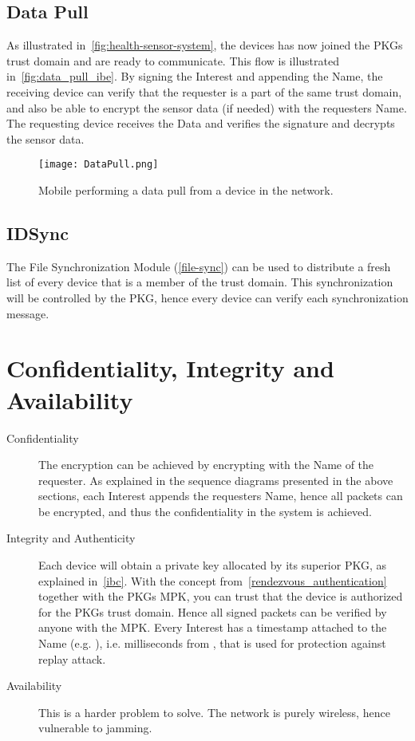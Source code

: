 \subsection{Data Pull}
As illustrated in~\autoref{fig:health-sensor-system}, the devices has now joined the \gls{PKG}s trust domain and are ready to communicate.
This flow is illustrated in~\autoref{fig:data_pull_ibe}.
By signing the Interest and appending the Name, the receiving device can verify that the requester is a part of the same trust domain, and also be able to encrypt the sensor data (if needed) with the requesters Name.
The requesting device receives the Data and verifies the signature and decrypts the sensor data.

\begin{figure}[ht]
  \centering
  \texttt{[image: DataPull.png]}
  \caption{Mobile performing a data pull from a device in the network.}
  \label{fig:data_pull_ibe}
\end{figure}

\subsection{IDSync}
The File Synchronization Module (\autoref{file-sync}) can be used to distribute a fresh list of every device that is a member of the trust domain.
This synchronization will be controlled by the \gls{PKG}, hence every device can verify each synchronization message.

\section{Confidentiality, Integrity and Availability}

\begin{description}
  \item[Confidentiality] 
  The encryption can be achieved by encrypting with the Name of the requester.
  As explained in the sequence diagrams presented in the above sections, each Interest appends the requesters Name, hence all packets can be encrypted, and thus the confidentiality in the system is achieved.
  \item[Integrity and Authenticity]
  Each device will obtain a private key allocated by its superior \gls{PKG}, as explained in~\autoref{ibc}.
  With the concept from~\autoref{rendezvous_authentication} together with the \gls{PKG}s \gls{MPK}, you can trust that the device is authorized for the \gls{PKG}s trust domain. Hence all signed packets can be verified by anyone with the \gls{MPK}.
  Every Interest has a timestamp attached to the Name (e.g. ), i.e. milliseconds from , that is used for protection against replay attack. 
  \item[Availability]
  This is a harder problem to solve.
  The network is purely wireless, hence vulnerable to jamming. 
\end{description}

